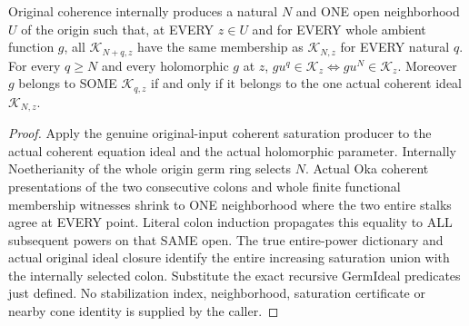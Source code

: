 \begin{theorem}
\label{hir:relative-normal-deformation-uniform-saturation}
\leanok
{}
Original coherence internally produces a natural $N$ and ONE open
neighborhood $U$ of the origin such that, at EVERY $z\in U$ and for EVERY
whole ambient function $g$, all $\mathcal K_{N+q,z}$ have the same
membership as $\mathcal K_{N,z}$ for EVERY natural $q$. For every $q\geq N$
and every holomorphic $g$ at $z$,
$gu^q\in\mathcal K_z\iff gu^N\in\mathcal K_z$.
Moreover $g$ belongs to SOME $\mathcal K_{q,z}$ if and only if it belongs
to the one actual coherent ideal $\mathcal K_{N,z}$.
\end{theorem}
\begin{proof}
Apply the genuine original-input coherent saturation producer to the actual
coherent equation ideal and the actual holomorphic parameter. Internally
Noetherianity of the whole origin germ ring selects $N$. Actual Oka coherent
presentations of the two consecutive colons and whole finite functional
membership witnesses shrink to ONE neighborhood where the two entire stalks
agree at EVERY point. Literal colon induction propagates this equality to
ALL subsequent powers on that SAME open. The true entire-power dictionary
and actual original ideal closure identify the entire increasing saturation
union with the internally selected colon. Substitute the exact recursive
GermIdeal predicates just defined. No stabilization index, neighborhood,
saturation certificate or nearby cone identity is supplied by the caller.
\end{proof}

